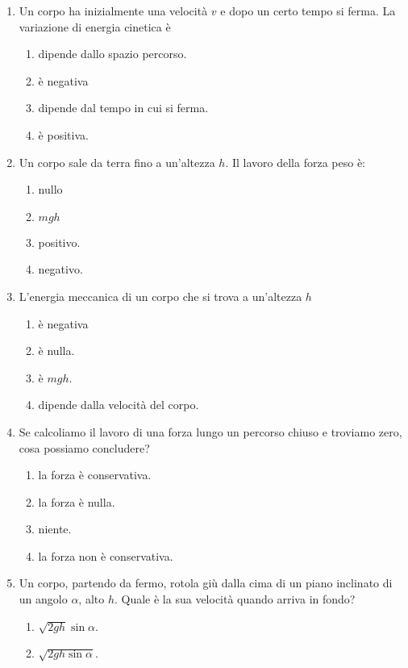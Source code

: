 \documentclass{article}
\begin{document}
\begin{enumerate}
\begin{enumerate}[label=\Alph*.]
  \end{enumerate}
  \item Un corpo ha inizialmente una velocità $v$ e dopo un certo tempo si ferma. La variazione di energia cinetica è
  \begin{enumerate}[label=\Alph*.]
    \item dipende dallo spazio percorso.
    \item è negativa
    \item dipende dal tempo in cui si ferma.
    \item è positiva.
  \end{enumerate}
  \item Un corpo sale da terra fino a un'altezza $h$. Il lavoro della forza peso è:
  \begin{enumerate}[label=\Alph*.]
    \item nullo
    \item $mgh$
    \item positivo.
    \item negativo.
  \end{enumerate}
  \item L'energia meccanica di un corpo che si trova a un'altezza $h$
  \begin{enumerate}[label=\Alph*.]
    \item è negativa
    \item è nulla.
    \item è $mgh$.
    \item dipende dalla velocità del corpo.
  \end{enumerate}
  \item Se calcoliamo il lavoro di una forza lungo un percorso chiuso e troviamo zero, cosa possiamo concludere?
  \begin{enumerate}[label=\Alph*.]
    \item la forza è conservativa.
    \item la forza è nulla.
    \item niente.
    \item la forza non è conservativa.
  \end{enumerate}
  \item Un corpo, partendo da fermo, rotola giù dalla cima di un piano inclinato di un angolo $\alpha$, alto $h$. Quale è la sua velocità quando arriva in fondo?
  \begin{enumerate}[label=\Alph*.]
    \item $\sqrt{2gh}\sin\alpha$.
    \item $\sqrt{2gh\sin\alpha}$.

\end{enumerate}
\end{enumerate}
\end{document}
